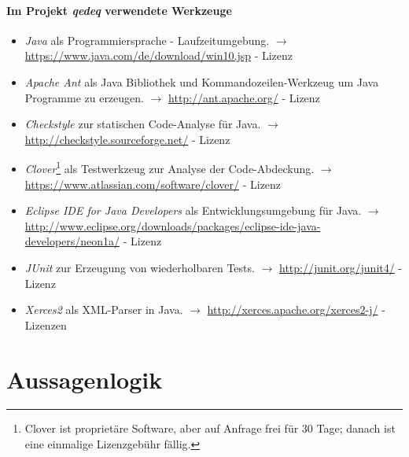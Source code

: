 \documentclass[english,ngerman,parskip=half,headsepline,footsepline]{scrreprt}
\newcounter{Enumi}
\begin{document}
	\paragraph{Im Projekt \emph{qedeq} verwendete Werkzeuge}
	\begin{itemize}
		\setcounter{enumi}{\value{Enumi}}
		
		\item\label{Werkzeug:Java}\emph{Java} als Programmiersprache - Laufzeitumgebung. $\rightarrow$ \url{https://www.java.com/de/download/win10.jsp} - Lizenz \cite{bib:JavaSE}
		
		\item\label{Werkzeug:Apache Ant}\emph{Apache Ant} als Java Bibliothek und Kommandozeilen-Werkzeug um Java Programme zu erzeugen. $\rightarrow$ \url{http://ant.apache.org/} - Lizenz \cite{bib:Apacheii}
		
		\item\label{Werkzeug:Checkstyle}\emph{Checkstyle} zur statischen Code-Analyse für Java. $\rightarrow$ \url{http://checkstyle.sourceforge.net/} - Lizenz \cite{bib:LGPLii}
		
		\item\label{Werkzeug:Clover}\emph{Clover}\footnote{ Clover ist proprietäre Software, aber auf Anfrage frei für 30 Tage; danach ist eine einmalige Lizenzgebühr fällig.} als Testwerkzeug zur Analyse der Code-Abdeckung. $\rightarrow$ \url{https://www.atlassian.com/software/clover/} - Lizenz \cite{bib:Clover}
		
		\item\label{Werkzeug:Eclipse Java}\emph{Eclipse IDE for Java Developers} als Entwicklungsumgebung für Java. $\rightarrow$ \url{http://www.eclipse.org/downloads/packages/eclipse-ide-java-developers/neon1a/} - Lizenz \cite{bib:OSI}
		
		\item\label{Werkzeug:JUnit}\emph{JUnit} zur Erzeugung von wiederholbaren Tests. $\rightarrow$ \url{http://junit.org/junit4/} - Lizenz \cite{bib:EPL}
		
		\item\label{Werkzeug:Xerces2}\emph{Xerces2} als XML-Parser in Java. $\rightarrow$ \url{http://xerces.apache.org/xerces2-j/} - Lizenzen \cite{bib:Apacheii,bib:SAX,bib:WDCDL,bib:WDCSNL}
		
		\setcounter{Enumi}{\value{enumi}}
	\end{itemize}
	
	\section{Aussagenlogik}
	\label{sec:Aussagenlogik}
	
\end{document}
